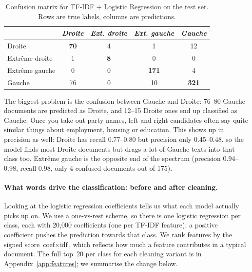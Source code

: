 \documentclass{article}
\begin{document}
\begin{table}[h]
  \caption{Confusion matrix for TF-IDF + Logistic Regression on the test set. Rows are true labels, columns are predictions.}
  \label{tab:confusion}
  \centering
  \begin{tabular}{lcccc}
    \toprule
    & \textit{Droite} & \textit{Ext. droite} & \textit{Ext. gauche} & \textit{Gauche} \\
    \midrule
    Droite              & \textbf{70} & 4  & 1   & 12 \\
    Extr\^{e}me droite  & 1  & \textbf{8} & 0   & 0 \\
    Extr\^{e}me gauche  & 0  & 0  & \textbf{171} & 4 \\
    Gauche              & 76 & 0  & 10  & \textbf{321} \\
    \bottomrule
  \end{tabular}
\end{table}

The biggest problem is the confusion between Gauche and Droite: 76--80 Gauche documents are predicted as Droite, and 12--15 Droite ones end up classified as Gauche. Once you take out party names, left and right candidates often say quite similar things about employment, housing or education. This shows up in precision as well: Droite has recall 0.77--0.80 but precision only 0.45--0.48, so the model finds most Droite documents but drags a lot of Gauche texts into that class too. Extr\^{e}me gauche is the opposite end of the spectrum (precision 0.94--0.98, recall 0.98, only 4 confused documents out of 175).

\paragraph{What words drive the classification: before and after cleaning.}
Looking at the logistic regression coefficients tells us what each model actually picks up on. We use a one-vs-rest scheme, so there is one logistic regression per class, each with 20{,}000 coefficients (one per TF-IDF feature); a positive coefficient pushes the prediction towards that class. We rank features by the signed score $\text{coef} \times \text{idf}$, which reflects how much a feature contributes in a typical document. The full top~20 per class for each cleaning variant is in Appendix~\ref{app:features}; we summarise the change below.
\end{document}
